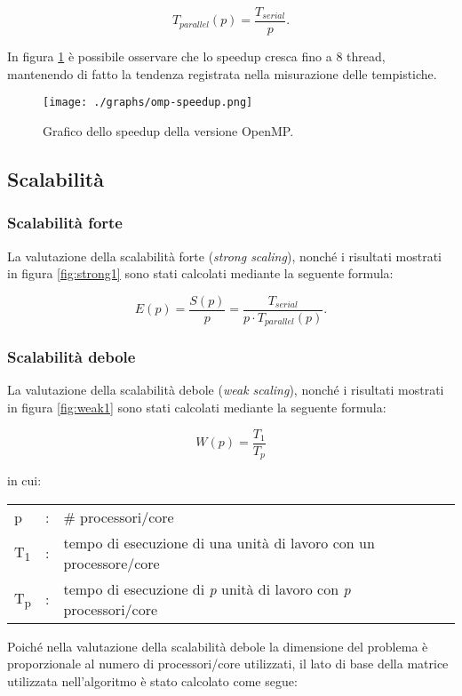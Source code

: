 \[
T_{parallel}(p) = \frac{T_{serial}}{p}.
\]

In figura \ref{fig:speedup1} è possibile osservare che lo speedup cresca fino a
8 thread, mantenendo di fatto la tendenza registrata nella misurazione delle
tempistiche.

\begin{figure}[!ht]
  \centering
  \texttt{[image: ./graphs/omp-speedup.png]}
  \caption{Grafico dello speedup della versione OpenMP.}\label{fig:speedup1}
\end{figure}

\subsection{Scalabilità}

\subsubsection{Scalabilità forte}

La valutazione della scalabilità forte (\textit{strong scaling}), nonché i
risultati mostrati in figura \ref{fig:strong1} sono stati calcolati mediante
la seguente formula:

\[
    E(p) = \frac{S(p)}{p} = \frac{T_{serial}}{p \cdot T_{parallel}(p)}.
\]

\subsubsection{Scalabilità debole}

La valutazione della scalabilità debole (\textit{weak scaling}), nonché i
risultati mostrati in figura \ref{fig:weak1} sono stati calcolati mediante
la seguente formula:

\[
W(p) = \frac{T_{1}}{T_{p}}
\]

in cui:
\begin{table}[!ht]
\begin{tabular}{lll}
    p &: & \# processori/core\\
    T\textsubscript{1}&: & tempo di esecuzione di una unità di lavoro con un
    processore/core\\
    T\textsubscript{p}&: & tempo di esecuzione di \textit{p} unità di lavoro con
    \textit{p} processori/core
\end{tabular}
\end{table}

Poiché nella valutazione della scalabilità debole la dimensione del problema è
proporzionale al numero di processori/core utilizzati, il lato di base della
matrice utilizzata nell'algoritmo è stato calcolato come segue:

